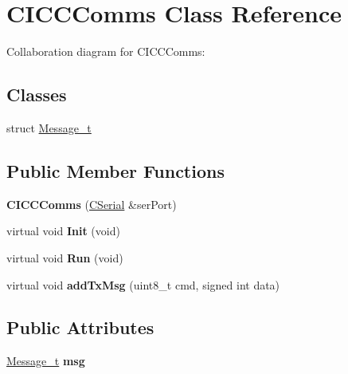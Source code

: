 \hypertarget{class_c_i_c_c_comms}{}\section{C\+I\+C\+C\+Comms Class Reference}
\label{class_c_i_c_c_comms}


Collaboration diagram for C\+I\+C\+C\+Comms\+:
\subsection*{Classes}
\begin{DoxyCompactItemize}
\item 
struct \mbox{\hyperlink{struct_c_i_c_c_comms_1_1_message__t}{Message\+\_\+t}}
\end{DoxyCompactItemize}
\subsection*{Public Member Functions}
\begin{DoxyCompactItemize}
\item 
\mbox{\label{class_c_i_c_c_comms_af2cb9bb6ab473bc5ea2b4aa2f98084ff}} 
{\bfseries C\+I\+C\+C\+Comms} (\mbox{\hyperlink{class_c_serial}{C\+Serial}} \&ser\+Port)
\item 
\mbox{\label{class_c_i_c_c_comms_a08eb020323826c69109ec0f9bb9b7ee5}} 
virtual void {\bfseries Init} (void)
\item 
\mbox{\label{class_c_i_c_c_comms_a8b3fa81307b3b9ba0e72b4aee8279c56}} 
virtual void {\bfseries Run} (void)
\item 
\mbox{\label{class_c_i_c_c_comms_ab925dd7ff82f30ccd9f770ab2281b3ab}} 
virtual void {\bfseries add\+Tx\+Msg} (uint8\+\_\+t cmd, signed int data)
\end{DoxyCompactItemize}
\subsection*{Public Attributes}
\begin{DoxyCompactItemize}
\item 
\mbox{\label{class_c_i_c_c_comms_a35a59d11110d830b70ab5e2a5644bbb9}} 
\mbox{\hyperlink{struct_c_i_c_c_comms_1_1_message__t}{Message\+\_\+t}} {\bfseries msg}
\end{DoxyCompactItemize}


